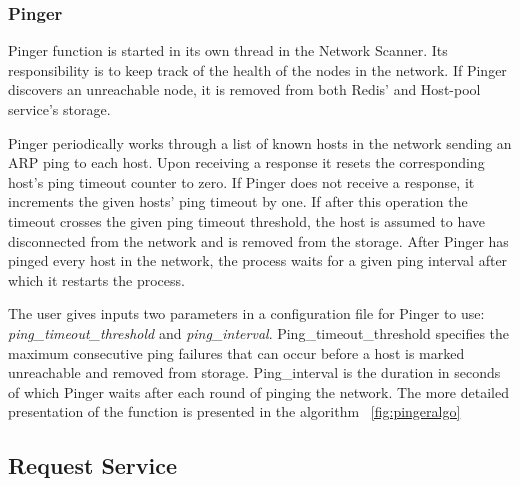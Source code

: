 \subsubsection{Pinger} \label{pinger}

Pinger function is started in its own thread in the Network Scanner. Its responsibility is to keep track of the health of the nodes in the network. If Pinger discovers an unreachable node, it is removed from both Redis' and Host-pool service's storage.

Pinger periodically works through a list of known hosts in the network sending an ARP ping to each host. Upon receiving a response it resets the corresponding host's ping timeout counter to zero. If Pinger does not receive a response, it increments the given hosts' ping timeout by one. If after this operation the timeout crosses the given ping timeout threshold, the host is assumed to have disconnected from the network and is removed from the storage. After Pinger has pinged every host in the network, the process waits for a given ping interval after which it restarts the process.

The user gives inputs two parameters in a configuration file for Pinger to use: \textit{ping\_timeout\_threshold} and \textit{ping\_interval}. Ping\_timeout\_threshold specifies the maximum consecutive ping failures that can occur before a host is marked unreachable and removed from storage. Ping\_interval is the duration in seconds of which Pinger waits after each round of pinging the network. The more detailed presentation of the function is presented in the algorithm ~\ref{fig:pingeralgo}

\subsection{Request Service} \label{requestservice}

